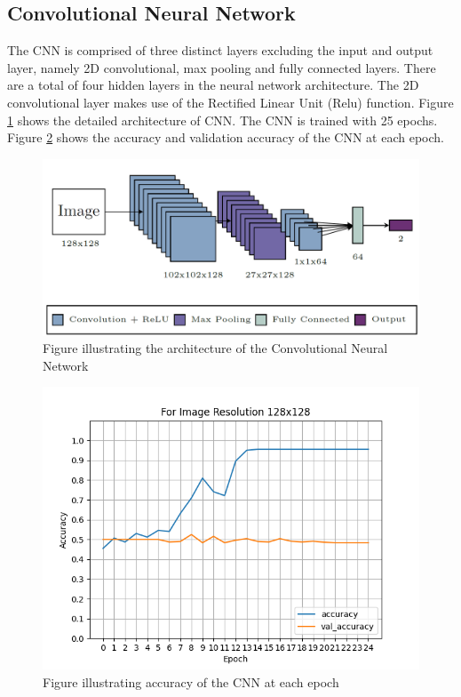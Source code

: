 \documentclass[preprint,12pt]{elsarticle}
\begin{document}
\subsection{Convolutional Neural Network}
The CNN is comprised of three distinct layers excluding the input and
output layer, namely 2D convolutional, max pooling and fully connected
layers. There are a total of four hidden layers in the neural network
architecture. The 2D convolutional layer makes use of the Rectified Linear
Unit (Relu) function. Figure \ref{fig:cnn_architecture} shows the detailed architecture of CNN. The
CNN is trained with 25 epochs. Figure \ref{fig:evaluation_model} shows the accuracy and validation
accuracy of the CNN at each epoch.

\begin{figure}
    \centering
    \includegraphics[width=\textwidth]{images/CNN_architecture.png}
    \caption{Figure illustrating the architecture of the Convolutional Neural Network}
    \label{fig:cnn_architecture}
\end{figure}

\begin{figure}
    \centering
    \includegraphics[width=\textwidth]{images/evaluate_model.png}
    \caption{Figure illustrating accuracy of the CNN at each epoch}
    \label{fig:evaluation_model}
\end{figure}
\end{document}
